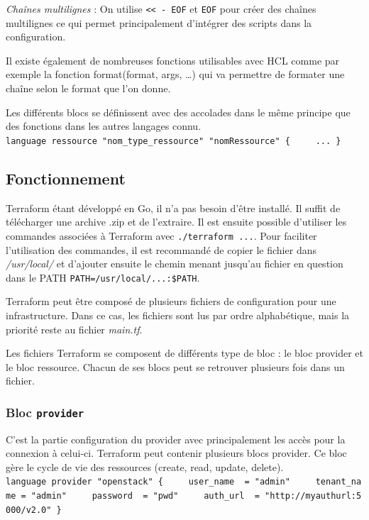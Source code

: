 \documentclass[]{article}
\begin{document}
\emph{Chaînes multilignes} : On utilise
\texttt{\textless{}\textless{}\ -\ EOF} et \texttt{EOF} pour créer des
chaînes multilignes ce qui permet principalement d'intégrer des scripts
dans la configuration.

Il existe également de nombreuses fonctions utilisables avec HCL comme
par exemple la fonction format(format, args, \ldots{}) qui va permettre
de formater une chaîne selon le format que l'on donne.

Les différents blocs se définissent avec des accolades dans le même
principe que des fonctions dans les autres langages connu.
\texttt{language\ ressource\ "nom\_type\_ressource"\ "nomRessource"\ \{\ \ \ \ \ ...\ \}}

\subsection{Fonctionnement}\label{fonctionnement}

Terraform étant développé en Go, il n'a pas besoin d'être installé. Il
suffit de télécharger une archive .zip et de l'extraire. Il est ensuite
possible d'utiliser les commandes associées à Terraform avec
\texttt{./terraform\ ...}. Pour faciliter l'utilisation des commandes,
il est recommandé de copier le fichier dans \emph{/usr/local/} et
d'ajouter ensuite le chemin menant jusqu'au fichier en question dans le
PATH \texttt{PATH=/usr/local/...:\$PATH}.

Terraform peut être composé de plusieurs fichiers de configuration pour
une infrastructure. Dans ce cas, les fichiers sont lus par ordre
alphabétique, mais la priorité reste au fichier \emph{main.tf}.

Les fichiers Terraform se composent de différents type de bloc : le bloc
provider et le bloc ressource. Chacun de ses blocs peut se retrouver
plusieurs fois dans un fichier.

\subsubsection{\texorpdfstring{Bloc
\textbf{\texttt{provider}}}{Bloc provider}}\label{bloc-provider}

C'est la partie configuration du provider avec principalement les accès
pour la connexion à celui-ci. Terraform peut contenir plusieurs blocs
provider. Ce bloc gère le cycle de vie des ressources (create, read,
update, delete).
\texttt{language\ provider\ "openstack"\ \{\ \ \ \ \ user\_name\ \ =\ "admin"\ \ \ \ \ tenant\_name\ =\ "admin"\ \ \ \ \ password\ \ =\ "pwd"\ \ \ \ \ auth\_url\ \ =\ "http://myauthurl:5000/v2.0"\ \}}
\end{document}
